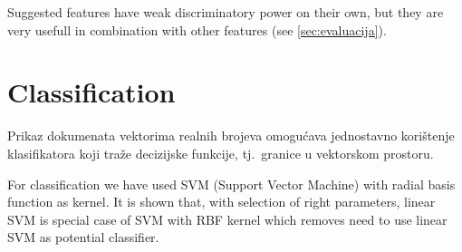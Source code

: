 \documentclass[11pt,english]{article}
\newcommand{\engl}[1]{(engl.~\emph{#1})}
\begin{document}
\begin{multicols}{2}
Suggested features have weak discriminatory power on their own, but they are
very usefull in combination with other features (see \ref{sec:evaluacija}).

\section{Classification}
Prikaz dokumenata vektorima realnih brojeva omogućava jednostavno korištenje
klasifikatora koji traže decizijske funkcije, tj.\ granice u vektorskom
prostoru.


For classification we have used SVM (Support Vector Machine) with radial basis
function as kernel. It is shown that, with selection of right parameters, linear
SVM is special case of SVM with RBF kernel \citep{keerthi2003asymptotic} which
removes need to use linear SVM as potential classifier.


\end{multicols}
\end{document}

